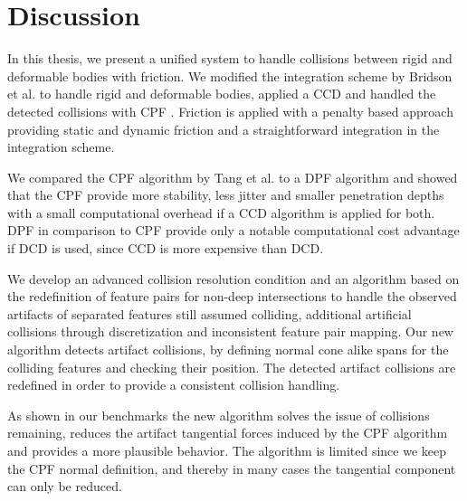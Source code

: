 \chapter{Discussion}
\label{ch:discussion}
In this thesis, we present a unified system to handle collisions between rigid and deformable bodies with friction. We modified the integration scheme by Bridson et al. \cite{BRIDSON2002} to handle rigid and deformable bodies, applied a CCD \cite{PROVOT1997} and handled the detected collisions with CPF \cite{TANG2012}. Friction is applied with a penalty based approach \cite{YAMANE2006} providing static and dynamic friction and a straightforward integration in the integration scheme.

We compared the CPF algorithm by Tang et al. \cite{TANG2012} to a DPF algorithm and showed that the CPF provide more stability, less jitter and smaller penetration depths with a small computational overhead if a CCD algorithm is applied for both. DPF in comparison to CPF provide only a notable computational cost advantage if DCD is used, since CCD is more expensive than DCD. %


We develop an advanced collision resolution condition and an algorithm based on the redefinition of feature pairs for non-deep intersections to handle the observed artifacts of separated features still assumed colliding, additional artificial collisions through discretization and inconsistent feature pair mapping. Our new algorithm detects artifact collisions, by defining normal cone alike spans for the colliding features and checking their position. The detected artifact collisions are redefined in order to provide a consistent collision handling.

As shown in our benchmarks the new algorithm solves the issue of collisions remaining, reduces the artifact tangential forces induced by the CPF algorithm and provides a more plausible behavior. The algorithm is limited since we keep the CPF normal definition, and thereby in many cases the tangential component can only be reduced.

